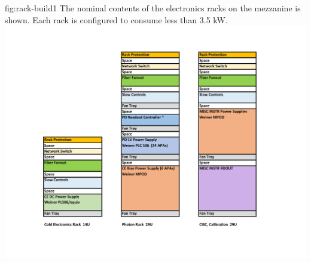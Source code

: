 \begin{dunefigure}{fig:rack-build1}
  {The nominal contents of the electronics racks on the mezzanine is shown. Each rack is configured to consume less than 3.5 \si{kW}. }
 \includegraphics[width=.98\textwidth]{graphics/rack-build1.pdf}
\end{dunefigure}

